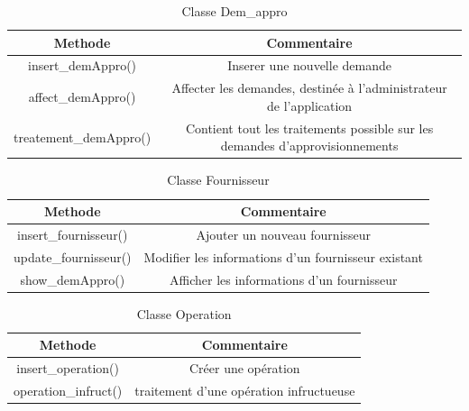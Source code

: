 \documentclass{report}
\begin{document}
\begin{table}[h!]
    \begin{center}
        \begin{tabular}{|c|c|}
            \hline
            \textbf{Methode} & \textbf{Commentaire}  \\
            \hline
            insert\_demAppro() & Inserer une nouvelle demande\\
            \hline
            affect\_demAppro()  & Affecter les demandes, destinée à l'administrateur de l'application\\
            \hline
            treatement\_demAppro()  & Contient tout les traitements possible sur les demandes d'approvisionnements\\
            \hline
        \end{tabular}
    \end{center}
\caption{Classe Dem\_appro}
\end{table}

\begin{table}[h!]
    \begin{center}
        \begin{tabular}{|c|c|}
            \hline
            \textbf{Methode} & \textbf{Commentaire}  \\
            \hline
            insert\_fournisseur() & Ajouter un nouveau fournisseur\\
            \hline
            update\_fournisseur()  & Modifier les informations d'un fournisseur existant\\
            \hline
            show\_demAppro()  & Afficher les informations d'un fournisseur\\
            \hline
        \end{tabular}
    \end{center}
\caption{Classe Fournisseur}
\end{table}

\begin{table}[h!]
    \begin{center}
        \begin{tabular}{|c|c|}
            \hline
            \textbf{Methode} & \textbf{Commentaire}  \\
            \hline
            insert\_operation() & Créer une opération\\
            \hline
            operation\_infruct()  & traitement d'une opération infructueuse\\
            \hline
        \end{tabular}
    \end{center}
\caption{Classe Operation}
\end{table}
\end{document}
